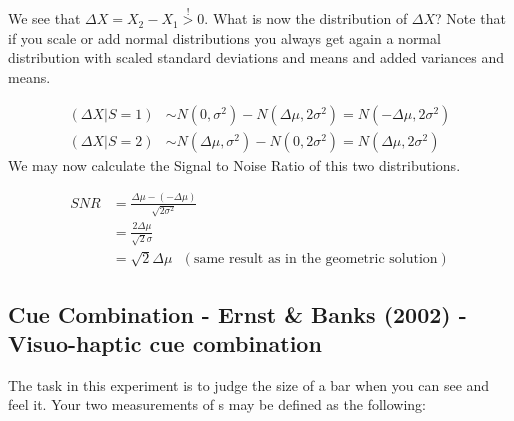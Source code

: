 \documentclass[../main/Notes.tex]{subfiles}
\begin{document}

We see that $\Delta X= X_{2}-X_{1} \stackrel{!}{>}0$. What is now the distribution of $\Delta X$? Note that if you scale or add normal distributions you always get again a normal distribution with scaled standard deviations and means and added variances and means.

\begin{align*}
\left(\Delta X | S = 1\right) &\sim N\left(0, \sigma^{2}\right) - N\left( \Delta \mu , 2\sigma^{2}\right) = N\left( -\Delta \mu , 2\sigma^{2}\right)\\
\left(\Delta X | S = 2\right) &\sim N\left(\Delta \mu, \sigma^{2}\right) - N\left(0, 2\sigma^{2}\right) = N \left( \Delta \mu , 2\sigma^{2}\right)
\end{align*}
We may now calculate the Signal to Noise Ratio of this two distributions.

\begin{center}
\begin{minipage}[b][3cm][t]{3.5cm}
\end{minipage}
\begin{minipage}[b][3.5cm][t]{12cm}
\begin{align*}
SNR &= \frac{\Delta\mu - (-\Delta\mu)}{\sqrt{2\sigma^2}}\\
    &= \frac{2\Delta\mu}{\sqrt{2}\sigma}\\
    &= \sqrt{2}\Delta\mu ~~~\left(\text{same result as in the geometric solution}\right)
\end{align*}
\end{minipage}
\end{center}

\subsection{Cue Combination - Ernst \& Banks (2002) - Visuo-haptic cue combination}
The task in this experiment is to judge the size of a bar when you can see and feel it. Your two measurements of s may be defined as the following:
\end{document}
